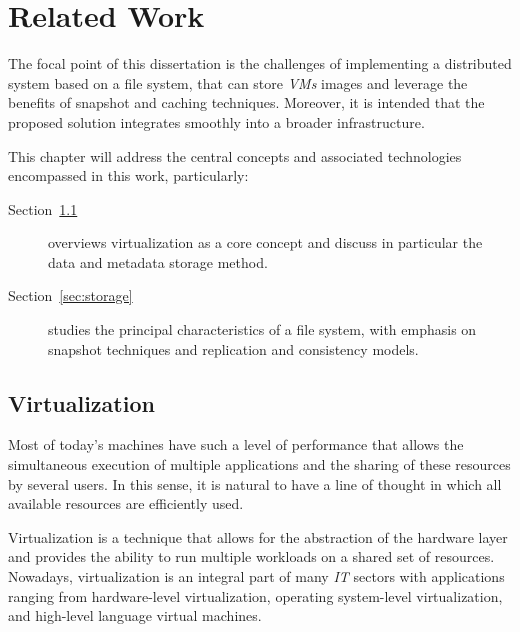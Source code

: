 
\chapter{Related Work}
\label{cha:related_work}

The focal point of this dissertation is the challenges of implementing a distributed system based on a file system, that can store \textit{VMs} images and leverage the benefits of snapshot and caching techniques. Moreover, it is intended that the proposed solution integrates smoothly into a broader infrastructure.

This chapter will address the central concepts and associated technologies encompassed in this work, particularly: \\
\begin{description}
	\item [Section~\ref{sec:virtualization}] overviews virtualization as a core concept and discuss in particular the data and metadata storage method.
	\item [Section~\ref{sec:storage}] studies the principal characteristics of a file system, with emphasis on snapshot techniques and replication and consistency models.

\end{description}

\section{Virtualization} %
\label{sec:virtualization}

Most of today's machines have such a level of performance that allows the simultaneous execution of multiple applications and the sharing of these resources by several users. In this sense, it is natural to have a line of thought in which all available resources are efficiently used. 

Virtualization is a technique that allows for the abstraction of the hardware layer and provides the ability to run multiple workloads on a shared set of resources. Nowadays, virtualization is an integral part of many \textit{IT} sectors with applications ranging from hardware-level virtualization, operating system-level
virtualization, and high-level language virtual machines.
\nocite{VMware_VM2006}



